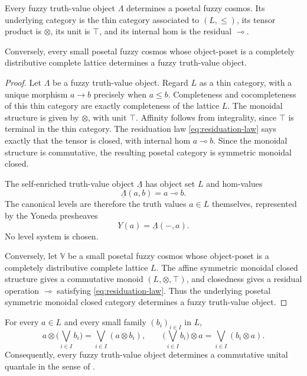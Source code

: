 \begin{proposition}
\label{prop:thin-fuzzy-cosmoses-and-fuzzy-truth-values}
    Every fuzzy truth-value object \(\Lambda\) determines a posetal fuzzy cosmos. Its underlying category is the thin category associated to \((L,\leq)\), its tensor product is \(\otimes\), its unit is \(\top\), and its internal hom is the residual \(\multimap\).

    Conversely, every small posetal fuzzy cosmos whose object-poset is a completely distributive complete lattice determines a fuzzy truth-value object.
\end{proposition}

\begin{proof}
    Let \(\Lambda\) be a fuzzy truth-value object. Regard \(L\) as a thin category, with a unique morphism \(a\to b\) precisely when \(a\leq b\). Completeness and cocompleteness of this thin category are exactly completeness of the lattice \(L\). The monoidal structure is given by \(\otimes\), with unit \(\top\). Affinity follows from integrality, since \(\top\) is terminal in the thin category. The residuation law \eqref{eq:residuation-law} says exactly that the tensor is closed, with internal hom \(a\multimap b\). Since the monoidal structure is commutative, the resulting posetal category is symmetric monoidal closed.

    The self-enriched truth-value object \(\underline{\Lambda}\) has object set \(L\) and hom-values
    \[
        \underline{\Lambda}(a,b)=a\multimap b.
    \]
    The canonical levels are therefore the truth values \(a\in L\) themselves, represented by the Yoneda presheaves
    \[
        Y(a)=\underline{\Lambda}(-,a).
    \]
    No level system is chosen.

    Conversely, let \(\mathbb V\) be a small posetal fuzzy cosmos whose object-poset is a completely distributive complete lattice \(L\). The affine symmetric monoidal closed structure gives a commutative monoid \((L,\otimes,\top)\), and closedness gives a residual operation \(\multimap\) satisfying \eqref{eq:residuation-law}. Thus the underlying posetal symmetric monoidal closed category determines a fuzzy truth-value object.
\end{proof}

\begin{proposition}
\label{prop:tensor-preserves-joins}
    For every \(a\in L\) and every small family \((b_i)_{i\in I}\) in
    \(L\),
    \[
        a\otimes \Big(\bigvee_{i\in I} b_i\Big)
        =
        \bigvee_{i\in I}(a\otimes b_i),
        \qquad
        \Big(\bigvee_{i\in I} b_i\Big)\otimes a
        =
        \bigvee_{i\in I}(b_i\otimes a).
    \]
    Consequently, every fuzzy truth-value object determines a commutative
    unital quantale in the sense of \cite[Definition~2.1]{stubbe-2014-quantaloid-enriched}.
\end{proposition}

